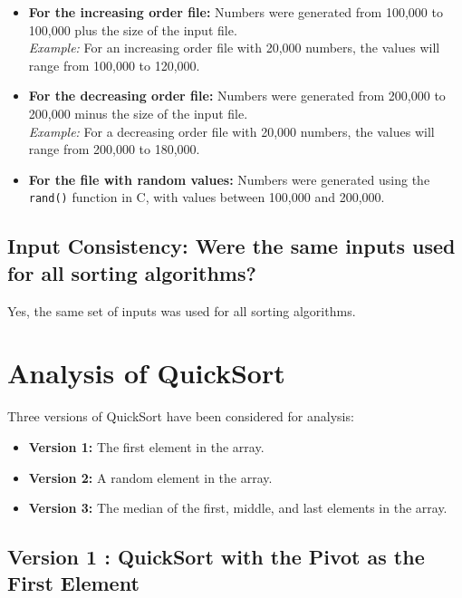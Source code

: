 \documentclass[a4paper,12pt]{report}
\begin{document}
\begin{itemize}[label=--]
    \item \textbf{For the increasing order file:} Numbers were generated from 100,000 to 100,000 plus the size of the input file.\\
    \textit{Example:} For an increasing order file with 20,000 numbers, the values will range from 100,000 to 120,000.
    
    \item \textbf{For the decreasing order file:} Numbers were generated from 200,000 to 200,000 minus the size of the input file.\\
    \textit{Example:} For a decreasing order file with 20,000 numbers, the values will range from 200,000 to 180,000.
    
    \item \textbf{For the file with random values:} Numbers were generated using the \texttt{rand()} function in C, with values between 100,000 and 200,000.
\end{itemize}

\subsection{Input Consistency: Were the same inputs used for all sorting algorithms?}
Yes, the same set of inputs was used for all sorting algorithms.

\section{Analysis of QuickSort}
Three versions of QuickSort have been considered for analysis:
\begin{itemize}
    \item \textbf{Version 1:} The first element in the array.
    \item \textbf{Version 2:} A random element in the array.
    \item \textbf{Version 3:} The median of the first, middle, and last elements in the array.
\end{itemize}

\subsection{Version 1 : QuickSort with the Pivot as the First Element} 
\end{document}
